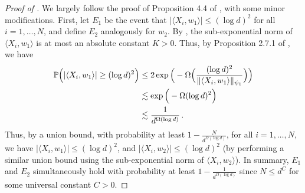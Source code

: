 \begin{proof}[Proof of ]
We largely follow the proof of Proposition 4.4 of \citet{ALPT2009_concentration}, with some minor modifications. First, let $E_1$ be the event that $|\langle X_i, w_1 \rangle| \leq (\log d)^2$ for all $i = 1, \ldots, N$, and define $E_2$ analogously for $w_2$. By , the sub-exponential norm of $\langle X_i, w_1 \rangle$ is at most an absolute constant $K > 0$. Thus, by Proposition 2.7.1 of \citet{vershynin2018high}, we have
\begin{align}
\mathbb{P}\Big(|\langle X_i, w_1 \rangle| \geq (\log d)^2\Big)
& \leq 2 \exp\Big(- \Omega\Big(\frac{(\log d)^2}{\|\langle X_i, w_1 \rangle\|_{\psi_1}}\Big) \Big) \\
& \lesssim \exp\Big(-\Omega(\log d)^2 \Big) \\
& \lesssim \frac{1}{d^{\Omega(\log d)}} \,.
\end{align}
Thus, by a union bound, with probability at least $1 - \frac{N}{d^{\Omega(\log d)}}$, for all $i = 1, \ldots, N$, we have $|\langle X_i, w_1 \rangle| \leq (\log d)^2$, and $|\langle X_i, w_2 \rangle| \leq (\log d)^2$ (by performing a similar union bound using the sub-exponential norm of $\langle X_i, w_2 \rangle$). In summary, $E_1$ and $E_2$ simultaneously hold with probability at least $1 - \frac{1}{d^{\Omega(\log d)}}$ since $N \leq d^C$ for some universal constant $C > 0$.


\end{proof}
